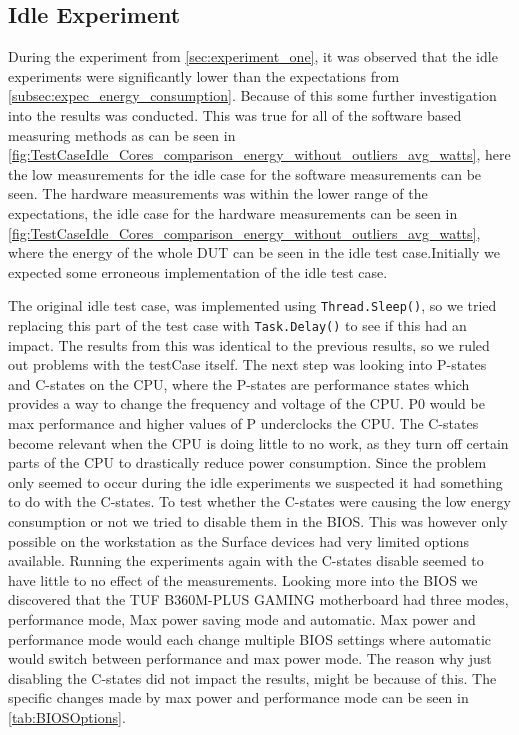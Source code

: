 \subsection{Idle Experiment}

During the experiment from \cref{sec:experiment_one}, it was observed that the idle experiments were significantly lower than the expectations from \cref{subsec:expec_energy_consumption}. Because of this some further investigation into the results was conducted. This was true for all of the software based measuring methods as can be seen in \cref{fig:TestCaseIdle_Cores_comparison_energy_without_outliers_avg_watts}, here the low measurements for the idle case for the software measurements can be seen.
The hardware measurements was within the lower range of the expectations, the idle case for the hardware measurements can be seen in \cref{fig:TestCaseIdle_Cores_comparison_energy_without_outliers_avg_watts}, where the energy of the whole DUT can be seen in the idle test case.Initially we expected some erroneous implementation of the idle test case. 



The original idle test case, was implemented using \texttt{Thread.Sleep()}, so we tried replacing this part of the test case with \texttt{Task.Delay()} to see if this had an impact. The results from this was identical to the previous results, so we ruled out problems with the testCase itself. The next step was looking into P-states and C-states on the CPU\cite[]{PCStat}, where the P-states are performance states which provides a way to change the frequency and voltage of the CPU. P0 would be max performance and higher values of P underclocks the CPU. The C-states become relevant when the CPU is doing little to no work, as they turn off certain parts of the CPU to drastically reduce power consumption. Since the problem only seemed to occur during the idle experiments we suspected it had something to do with the C-states. To test whether the C-states were causing the low energy consumption or not we tried to disable them in the BIOS. This was however only possible on the workstation as the Surface devices had very limited options available. Running the experiments again with the C-states disable seemed to have little to no effect of the measurements. Looking more into the BIOS we discovered that the TUF B360M-PLUS GAMING motherboard had three modes, performance mode, Max power saving mode and automatic. Max power and performance mode would each change multiple BIOS settings where automatic would switch between performance and max power mode. The reason why just disabling the C-states did not impact the results, might be because of this. The specific changes made by max power and performance mode can be seen in \cref{tab:BIOSOptions}.

